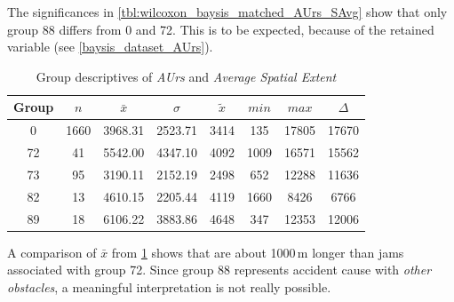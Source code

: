The significances in \cref{tbl:wilcoxon_baysis_matched_AUrs_SAvg} show that only group 88 differs from 0 and 72. This is to be expected, because of the retained variable (see \cref{baysis_dataset_AUrs}). 
\begin{table}[ht!]
	\small
	\centering
	\begin{tabular}{c|c|c|c|c|c|c|c}
		\toprule
		Group & $n$ & $\bar{x}$ & $\sigma$ & $\tilde{x}$ & $min$ & $max$ & $\Delta$ \\ 
		\midrule
		0  & 1660 & 3968.31 & 2523.71 & 3414 & 135  & 17805 & 17670 \\ 
		72 & 41   & 5542.00 & 4347.10 & 4092 & 1009 & 16571 & 15562 \\ 
		73 & 95   & 3190.11 & 2152.19 & 2498 & 652  & 12288 & 11636 \\ 
		82 & 13   & 4610.15 & 2205.44 & 4119 & 1660 & 8426  & 6766  \\ 
		89 & 18   & 6106.22 & 3883.86 & 4648 & 347  & 12353 & 12006 \\ 
		\bottomrule
	\end{tabular}
	\caption{Group descriptives of \textit{AUrs} and \textit{Average Spatial Extent}}
	\label{tbl:descriptives_baysis_matched_AUrs_SAvg}
\end{table}
A comparison of $\bar{x}$ from \cref{tbl:descriptives_baysis_matched_AUrs_SAvg} shows that are about 1000\,m longer than jams associated with group 72. Since group 88 represents accident cause with \textit{other obstacles}, a meaningful interpretation is not really possible. 

